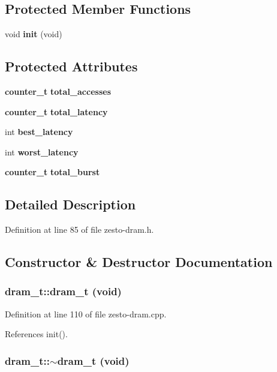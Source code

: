 \subsection*{Protected Member Functions}
\begin{CompactItemize}
\item 
void {\bf init} (void)
\end{CompactItemize}
\subsection*{Protected Attributes}
\begin{CompactItemize}
\item 
{\bf counter\_\-t} {\bf total\_\-accesses}
\item 
{\bf counter\_\-t} {\bf total\_\-latency}
\item 
int {\bf best\_\-latency}
\item 
int {\bf worst\_\-latency}
\item 
{\bf counter\_\-t} {\bf total\_\-burst}
\end{CompactItemize}


\subsection{Detailed Description}


Definition at line 85 of file zesto-dram.h.

\subsection{Constructor \& Destructor Documentation}
\subsubsection[{dram\_\-t}]{\setlength{\rightskip}{0pt plus 5cm}dram\_\-t::dram\_\-t (void)}\label{classdram__t_cb7527b5c3b939bdda28d4a4ea5d50f7}




Definition at line 110 of file zesto-dram.cpp.

References init().
\subsubsection[{$\sim$dram\_\-t}]{\setlength{\rightskip}{0pt plus 5cm}dram\_\-t::$\sim$dram\_\-t (void)\hspace{0.3cm}{\tt  [virtual]}}\label{classdram__t_42993bebdf501ebce4d04fe993adc20d}




